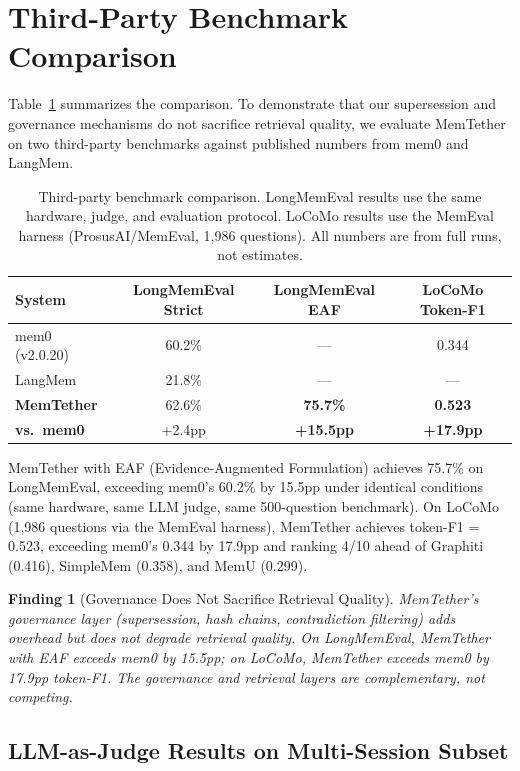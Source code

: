 \documentclass{article}
\newtheorem{finding}{Finding}
\begin{document}
\section{Third-Party Benchmark Comparison}
\label{sec:thirdparty}

Table~\ref{tab:thirdparty} summarizes the comparison. To demonstrate that our supersession and governance mechanisms do not sacrifice retrieval quality, we evaluate MemTether on two third-party benchmarks against published numbers from mem0 and LangMem.

\begin{table}[h]
\centering
\caption{Third-party benchmark comparison. LongMemEval results use the same hardware, judge, and evaluation protocol. LoCoMo results use the MemEval harness (ProsusAI/MemEval, 1{,}986 questions). All numbers are from full runs, not estimates.}
\label{tab:thirdparty}
\begin{tabular}{lccc}
\toprule
System & LongMemEval Strict & LongMemEval EAF & LoCoMo Token-F1 \\
\midrule
mem0 (v2.0.20) & 60.2\% & --- & 0.344 \\
LangMem & 21.8\% & --- & --- \\
\textbf{MemTether} & 62.6\% & \textbf{75.7\%} & \textbf{0.523} \\
\midrule
\textbf{vs.\ mem0} & +2.4pp & \textbf{+15.5pp} & \textbf{+17.9pp} \\
\bottomrule
\end{tabular}
\end{table}

MemTether with EAF (Evidence-Augmented Formulation) achieves 75.7\% on LongMemEval, exceeding mem0's 60.2\% by 15.5pp under identical conditions (same hardware, same LLM judge, same 500-question benchmark). On LoCoMo (1{,}986 questions via the MemEval harness), MemTether achieves token-F1 = 0.523, exceeding mem0's 0.344 by 17.9pp and ranking 4/10 ahead of Graphiti (0.416), SimpleMem (0.358), and MemU (0.299).

\begin{finding}[Governance Does Not Sacrifice Retrieval Quality]
MemTether's governance layer (supersession, hash chains, contradiction filtering) adds overhead but does not degrade retrieval quality. On LongMemEval, MemTether with EAF exceeds mem0 by 15.5pp; on LoCoMo, MemTether exceeds mem0 by 17.9pp token-F1. The governance and retrieval layers are complementary, not competing.
\end{finding}


\subsection{LLM-as-Judge Results on Multi-Session Subset}
\end{document}
